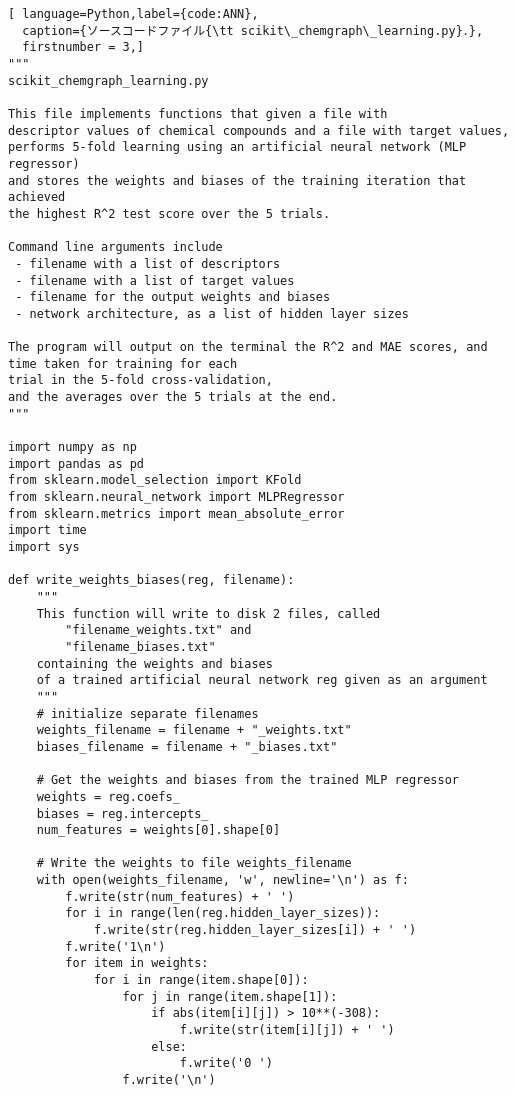 \documentclass[11pt,titlepage,dvipdfmx,twoside]{jarticle}
\begin{document}
\begin{lstlisting}[ language=Python,label={code:ANN},
  caption={ソースコードファイル{\tt scikit\_chemgraph\_learning.py}．},
  firstnumber = 3,]
"""
scikit_chemgraph_learning.py

This file implements functions that given a file with
descriptor values of chemical compounds and a file with target values,
performs 5-fold learning using an artificial neural network (MLP regressor)
and stores the weights and biases of the training iteration that achieved
the highest R^2 test score over the 5 trials. 

Command line arguments include
 - filename with a list of descriptors
 - filename with a list of target values
 - filename for the output weights and biases
 - network architecture, as a list of hidden layer sizes
 
The program will output on the terminal the R^2 and MAE scores, and
time taken for training for each 
trial in the 5-fold cross-validation, 
and the averages over the 5 trials at the end.
"""

import numpy as np
import pandas as pd
from sklearn.model_selection import KFold
from sklearn.neural_network import MLPRegressor
from sklearn.metrics import mean_absolute_error
import time
import sys

def write_weights_biases(reg, filename):
    """ 
    This function will write to disk 2 files, called
        "filename_weights.txt" and
        "filename_biases.txt"
    containing the weights and biases 
    of a trained artificial neural network reg given as an argument
    """
    # initialize separate filenames
    weights_filename = filename + "_weights.txt"
    biases_filename = filename + "_biases.txt"
    
    # Get the weights and biases from the trained MLP regressor
    weights = reg.coefs_
    biases = reg.intercepts_
    num_features = weights[0].shape[0]
    
    # Write the weights to file weights_filename
    with open(weights_filename, 'w', newline='\n') as f:
        f.write(str(num_features) + ' ')
        for i in range(len(reg.hidden_layer_sizes)):
            f.write(str(reg.hidden_layer_sizes[i]) + ' ')
        f.write('1\n')
        for item in weights:
            for i in range(item.shape[0]):
                for j in range(item.shape[1]):
                    if abs(item[i][j]) > 10**(-308):
                        f.write(str(item[i][j]) + ' ')
                    else:
                        f.write('0 ')
                f.write('\n')
    

\end{lstlisting}
\end{document}
